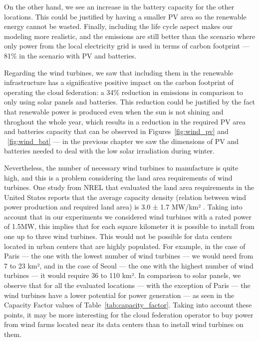 On the other hand, we see an increase in the battery capacity for the other locations. This could be justified by having a smaller PV area so the renewable energy cannot be wasted. Finally, including the life cycle aspect makes our modeling more realistic, and the emissions are still better than the scenario where only power from the local electricity grid is used in terms of carbon footprint --- 81\% in the scenario with PV and batteries.  


Regarding the wind turbines, we saw that including them in the renewable infrastructure has a significative positive impact on the carbon footprint of operating the cloud federation: a 34\% reduction in  emissions in comparison to only using solar panels and batteries. This reduction could be justified by the fact that renewable power is produced even when the sun is not shining and throghout the whole year, which results in a reduction in the required PV area and batteries capacity that can be observed in Figures~\ref{fig:wind_pv} and ~\ref{fig:wind_bat}  --- in the previous chapter we saw the dimensions of PV and batteries needed to deal with the low solar irradiation during winter.

Nevertheless, the number of necessary wind turbines to manufacture is quite high, and this is a problem considering the land area requirements of wind turbines. One study from NREL that evaluated the land area requirements in the United States reports that the average capacity density (relation between wind power production and required land area) is 3.0 ± 1.7 MW/km² \cite{wtlanduse_2009}. Taking into account that in our experiments we considered wind turbines with a rated power of 1.5MW, this implies that for each square kilometer it is possible to install from one up to three wind turbines. This would not be possible for data centers located in urban centers that are highly populated. For example, in the case of Paris --- the one with the lowest number of wind turbines --- we would need from 7 to 23 km², and in the case of Seoul --- the one with the highest number of wind turbines --- it would require 36 to 110 km².  In comparison to solar panels, we observe that for all the evaluated locations --- with the exception of Paris --- the wind turbines have a lower potential for power generation --- as seen in the Capacity Factor values of Table~\ref{tab:capacity_factor}. Taking into account these points, it may be more interesting for the cloud federation operator to buy power from wind farms located near its data centers than to install wind turbines on them.

